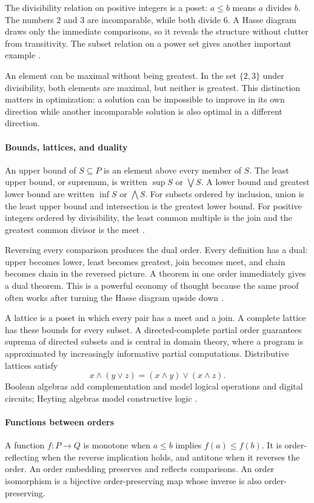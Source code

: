 The divisibility relation on positive integers is a poset: $a\leq b$ means $a$ divides $b$. The numbers $2$ and $3$ are incomparable, while both divide $6$. A Hasse diagram draws only the immediate comparisons, so it reveals the structure without clutter from transitivity. The subset relation on a power set gives another important example \cite{order_theory_ref1}.

An element can be maximal without being greatest. In the set $\{2,3\}$ under divisibility, both elements are maximal, but neither is greatest. This distinction matters in optimization: a solution can be impossible to improve in its own direction while another incomparable solution is also optimal in a different direction.

\paragraph{Bounds, lattices, and duality}
An upper bound of $S\subseteq P$ is an element above every member of $S$. The least upper bound, or supremum, is written $\sup S$ or $\bigvee S$. A lower bound and greatest lower bound are written $\inf S$ or $\bigwedge S$. For subsets ordered by inclusion, union is the least upper bound and intersection is the greatest lower bound. For positive integers ordered by divisibility, the least common multiple is the join and the greatest common divisor is the meet \cite{order_theory_ref1}.

Reversing every comparison produces the dual order. Every definition has a dual: upper becomes lower, least becomes greatest, join becomes meet, and chain becomes chain in the reversed picture. A theorem in one order immediately gives a dual theorem. This is a powerful economy of thought because the same proof often works after turning the Hasse diagram upside down \cite{order_theory_ref2}.

A lattice is a poset in which every pair has a meet and a join. A complete lattice has these bounds for every subset. A directed-complete partial order guarantees suprema of directed subsets and is central in domain theory, where a program is approximated by increasingly informative partial computations. Distributive lattices satisfy
\[
x\wedge(y\vee z)=(x\wedge y)\vee(x\wedge z).
\]
Boolean algebras add complementation and model logical operations and digital circuits; Heyting algebras model constructive logic \cite{order_theory_ref3}.

\paragraph{Functions between orders}
A function $f:P\to Q$ is monotone when $a\leq b$ implies $f(a)\leq f(b)$. It is order-reflecting when the reverse implication holds, and antitone when it reverses the order. An order embedding preserves and reflects comparisons. An order isomorphism is a bijective order-preserving map whose inverse is also order-preserving.


